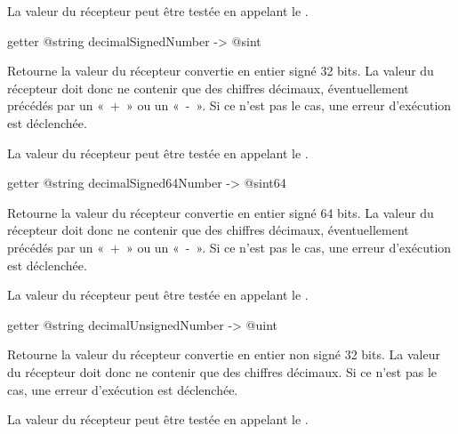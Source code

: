 La valeur du récepteur peut être testée en appelant le .








\begin{galgas3box}
getter @string decimalSignedNumber -> @sint
\end{galgas3box}

Retourne la valeur du récepteur convertie en entier signé 32 bits. La valeur du récepteur doit donc ne contenir que des chiffres décimaux, éventuellement précédés par un «~+~» ou un «~-~». Si ce n'est pas le cas, une erreur d'exécution est déclenchée.

La valeur du récepteur peut être testée en appelant le .








\begin{galgas3box}
getter @string decimalSigned64Number -> @sint64
\end{galgas3box}

Retourne la valeur du récepteur convertie en entier signé 64 bits. La valeur du récepteur doit donc ne contenir que des chiffres décimaux, éventuellement précédés par un «~+~» ou un «~-~». Si ce n'est pas le cas, une erreur d'exécution est déclenchée.

La valeur du récepteur peut être testée en appelant le .








\begin{galgas3box}
getter @string decimalUnsignedNumber -> @uint
\end{galgas3box}

Retourne la valeur du récepteur convertie en entier non signé 32 bits. La valeur du récepteur doit donc ne contenir que des chiffres décimaux. Si ce n'est pas le cas, une erreur d'exécution est déclenchée.

La valeur du récepteur peut être testée en appelant le .







